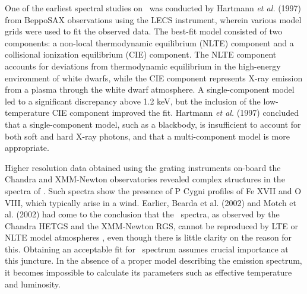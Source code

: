 	One of the earliest spectral studies on \source\ was conducted by Hartmann \textit{et al.} (1997) \cite{hartmann1999constraining} from BeppoSAX observations using the LECS instrument, wherein various model grids were used to fit the observed data. The best-fit model consisted of two components: a non-local thermodynamic equilibrium (NLTE) component and a collisional ionization equilibrium (CIE) component. The NLTE component accounts for deviations from thermodynamic equilibrium in the high-energy environment of white dwarfs, while the CIE component represents X-ray emission from a plasma through the white dwarf atmosphere. %
	A single-component model led to a significant discrepancy above 1.2 keV, but the inclusion of the low-temperature CIE component improved the fit. Hartmann \textit{et al.} (1997) \cite{hartmann1999constraining} concluded that a single-component model, such as a blackbody, is insufficient to account for both soft and hard X-ray photons, and that a multi-component model is more appropriate.
	
	Higher resolution data obtained using the grating instruments on-board the Chandra and XMM-Newton observatories revealed complex structures in the spectra of \source. Such spectra show the presence of P Cygni profiles of Fe XVII and O VIII, which typically arise in a wind. Earlier, Bearda et al. (2002) and Motch et al. (2002) had come to the conclusion that the \source\ spectra, as observed by the Chandra HETGS and the XMM-Newton RGS, cannot be reproduced by LTE or NLTE model atmospheres \cite{beardaChandra2002AA,motchXmmNewton2002AA}, even though there is little clarity on the reason for this. Obtaining an acceptable fit for \source\ spectrum assumes crucial importance at this juncture. In the absence of a proper model describing the emission spectrum, it becomes impossible to calculate its parameters such as effective temperature and luminosity.
	
